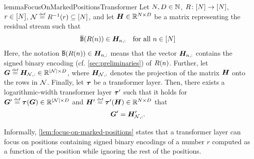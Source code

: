 \begin{restatable}{lemma}{FocusOnMarkedPositionsTransformer} \label{lem:focus-on-marked-positions}
   Let ${{N}}, {{D}} \in {{\mathbb{N}}}$, $R\colon {\left[ {{N}}\right]} \to {\left[ {{N}}\right]}$, $r \in {\left[ {{N}}\right]}$, ${{{\mathcal{N}}}} \mathrel{\stackrel{\textnormal{\tiny def}}{=}} {R^{{-1}}}(r) \subseteq {\left[ {{N}}\right]}$, and let ${{{{{{{\bm{H}}}}}}}} \in {{\mathbb{R}}}^{{{N}} \times {{D}}}$ be a matrix representing the residual stream such that
   \begin{equation} \label{eq:focus-on-positions-condition}
      \fullBinEnc{R(\stridx)} \in \residStream_{\stridx, :} \quad \text{for all } \stridx \in \NTo{\strlen}
   \end{equation}
   Here, the notation $\fullBinEnc{R(\stridx)} \in \residStream_{\stridx, :}$ means that the vector ${{{{{{{\bm{H}}}}}}}}_{{{n}}, :}$ contains the signed binary encoding (cf. \cref{sec:preliminaries}) of $R({{n}})$.
   Further, let ${{{\bm{G}}}} \mathrel{\stackrel{\textnormal{\tiny def}}{=}} {{{{{{{\bm{H}}}}}}}}_{{{{\mathcal{N}}}}, :} \in {{\mathbb{R}}}^{|{{{\mathcal{N}}}}| \times {{D}}}$, where ${{{{{{{\bm{H}}}}}}}}_{{{{\mathcal{N}}}}, :}$ denotes the projection of the matrix ${{{{{{{\bm{H}}}}}}}}$ onto the rows in ${{{\mathcal{N}}}}$.
   Finally, let ${{\boldsymbol{\tau}}}$ be a transformer layer.
   Then, there exists a logarithmic-width transformer layer ${{\boldsymbol{\tau}}}'$ such that it holds for ${{{\bm{G}}}}' \mathrel{\stackrel{\textnormal{\tiny def}}{=}} {{\boldsymbol{\tau}}}({{{\bm{G}}}}) \in {{\mathbb{R}}}^{|{{{\mathcal{N}}}}| \times {{D}}}$ and ${{{{{{{\bm{H}}}}}}}}' \mathrel{\stackrel{\textnormal{\tiny def}}{=}} {{\boldsymbol{\tau}}}'({{{{{{{\bm{H}}}}}}}}) \in {{\mathbb{R}}}^{{{N}} \times {{D}}}$ that
   \begin{equation}
      {{{\bm{G}}}}' = {{{{{{{\bm{H}}}}}}}}'_{{{{\mathcal{N}}}}, :}.
   \end{equation}
\end{restatable}
Informally, \cref{lem:focus-on-marked-positions} states that a transformer layer can focus on positions containing signed binary encodings of a number $r$ computed as a function of the position while ignoring the rest of the positions.

